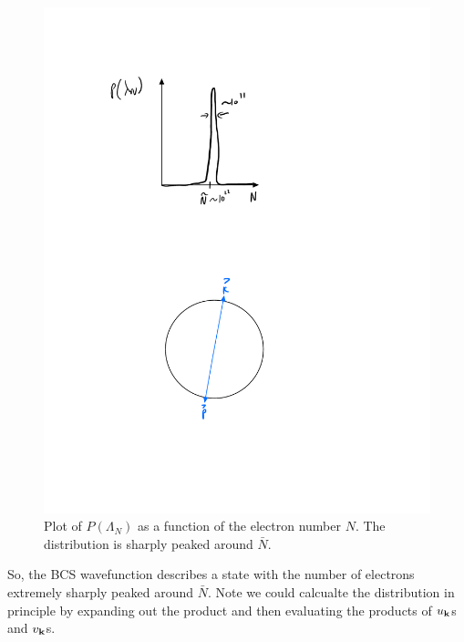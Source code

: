 \begin{figure}[htbp]
    \centering
    \includegraphics[scale=0.7]{Images/fig-localizedlambdaN.pdf}
    \caption{Plot of $P(\Lambda_N)$ as a function of the electron number $N$. The distribution is sharply peaked around $\bar{N}$.}
    \label{fig-localizedlambdaN}
\end{figure}

So, the BCS wavefunction describes a state with the number of electrons extremely sharply peaked around $\bar{N}$. Note we could calcualte the distribution in principle by expanding out the product and then evaluating the products of $u_{\mathbf{k}}$s and $v_{\mathbf{k}}$s.

